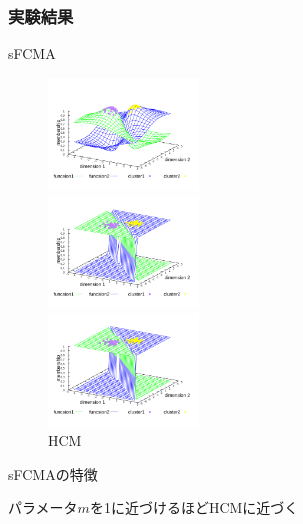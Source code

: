 \documentclass[13pt,dvipdfmx]{beamer}
\begin{document}
\begin{frame}\frametitle{実験結果}
  \begin{block}{sFCMA}
    \begin{figure}[htbp]
      \begin{minipage}{0.32\hsize}
        \begin{center}
          \includegraphics[width=40mm]{sFCMA-Em2.pdf}
        \end{center}
        \captionsetup{labelformat=empty,labelsep=none}
        \caption{$m=2$}
        \label{fig:one}
      \end{minipage}
      \begin{minipage}{0.32\hsize}
        \begin{center}
          \includegraphics[width=40mm]{sFCMA-Em11.pdf}
        \end{center}
        \captionsetup{labelformat=empty,labelsep=none}
        \caption{$m=1.01$}
        \label{fig:two}
      \end{minipage}
     \begin{minipage}{0.32\hsize}
        \begin{center}
          \includegraphics[width=40mm]{HCM.pdf}
        \end{center}
        \captionsetup{labelformat=empty,labelsep=none}
        \caption{HCM}
        \label{fig:three}
     \end{minipage}
    \end{figure}
  \end{block}
  \begin{block}{sFCMAの特徴}
    \begin{center}
      パラメータ$m$を1に近づけるほどHCMに近づく
    \end{center}
  \end{block}
\end{frame}
\end{document}
